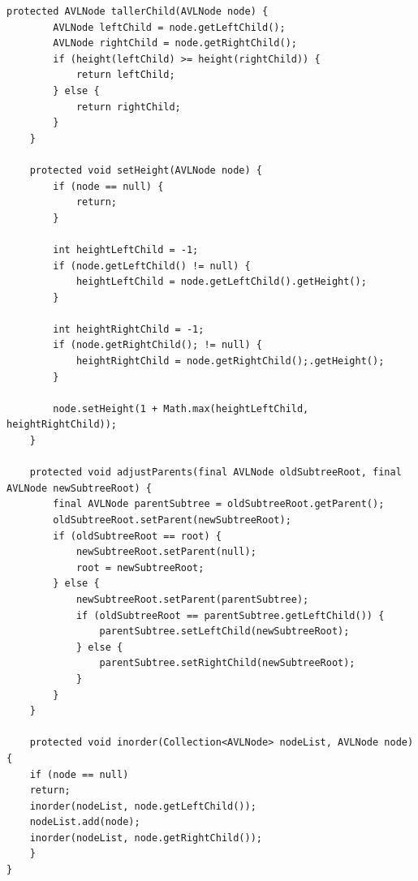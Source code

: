 \begin{lstlisting}[caption=AVL Tree]
	protected AVLNode tallerChild(AVLNode node) {
		AVLNode leftChild = node.getLeftChild();
		AVLNode rightChild = node.getRightChild();
		if (height(leftChild) >= height(rightChild)) {
			return leftChild;
		} else {
			return rightChild;
		}
	}

	protected void setHeight(AVLNode node) {
		if (node == null) {
			return;
		}

		int heightLeftChild = -1;
		if (node.getLeftChild() != null) {
			heightLeftChild = node.getLeftChild().getHeight();
		}

		int heightRightChild = -1;
		if (node.getRightChild(); != null) {
			heightRightChild = node.getRightChild();.getHeight();
		}

		node.setHeight(1 + Math.max(heightLeftChild, heightRightChild));
	}

	protected void adjustParents(final AVLNode oldSubtreeRoot, final AVLNode newSubtreeRoot) {
		final AVLNode parentSubtree = oldSubtreeRoot.getParent();
		oldSubtreeRoot.setParent(newSubtreeRoot);
		if (oldSubtreeRoot == root) {
			newSubtreeRoot.setParent(null);
			root = newSubtreeRoot;
		} else {
			newSubtreeRoot.setParent(parentSubtree);
			if (oldSubtreeRoot == parentSubtree.getLeftChild()) {
				parentSubtree.setLeftChild(newSubtreeRoot);
			} else {
				parentSubtree.setRightChild(newSubtreeRoot);
			}
		}
	}

	protected void inorder(Collection<AVLNode> nodeList, AVLNode node) {
	if (node == null)
	return;
	inorder(nodeList, node.getLeftChild());
	nodeList.add(node);
	inorder(nodeList, node.getRightChild());
	}
}
\end{lstlisting}

